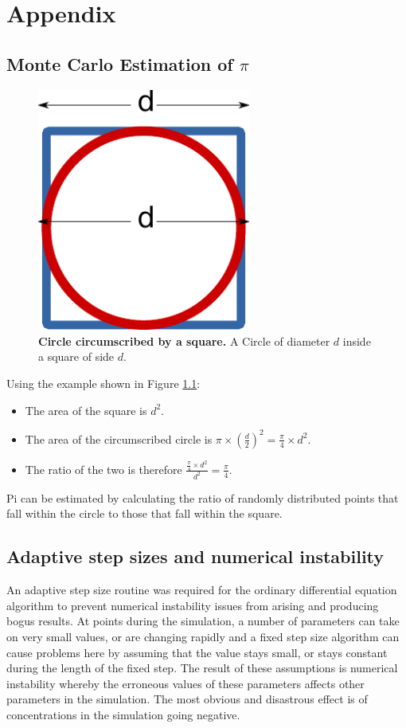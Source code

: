 \appendix
\chapter{Appendix}
\section{\texorpdfstring{Monte Carlo Estimation of $\pi$}{Monte Carlo Estimation of Pi}}
\begin{figure}[ht]
 \centering
 \includegraphics[width=7cm, trim=0cm 0cm 0cm 0.3cm]{./appendix/data/monte-carlo-pi.pdf}
 \caption[Circle circumscribed by a square]{{\bf Circle circumscribed by a square.} A Circle of diameter $d$ inside a square of side $d$.
 \label{fig:circle-square}}
\end{figure}
\noindent Using the example shown in Figure \ref{fig:circle-square}:
\begin{itemize}
 \item The area of the square is $d^2$.
 \item The area of the circumscribed circle is $\pi\times\left(\frac{d}{2}\right)^2 = \frac{\pi}{4}\times d^2$.
 \item The ratio of the two is therefore $\frac{\frac{\pi}{4}\times d^2}{d^2} = \frac{\pi}{4}$.
\end{itemize}
Pi can be estimated by calculating the ratio of randomly distributed points that fall within the circle to those that fall within the square.

\section{Adaptive step sizes and numerical instability}
An adaptive step size routine was required for the ordinary differential equation algorithm to prevent numerical instability issues from arising and producing bogus results. At points during the simulation, a number of parameters can take on very small values, or are changing rapidly and a fixed step size algorithm can cause problems here by assuming that the value stays small, or stays constant during the length of the fixed step. The result of these assumptions is numerical instability whereby the erroneous values of these parameters affects other parameters in the simulation. The most obvious and disastrous effect is of concentrations in the simulation going negative.

